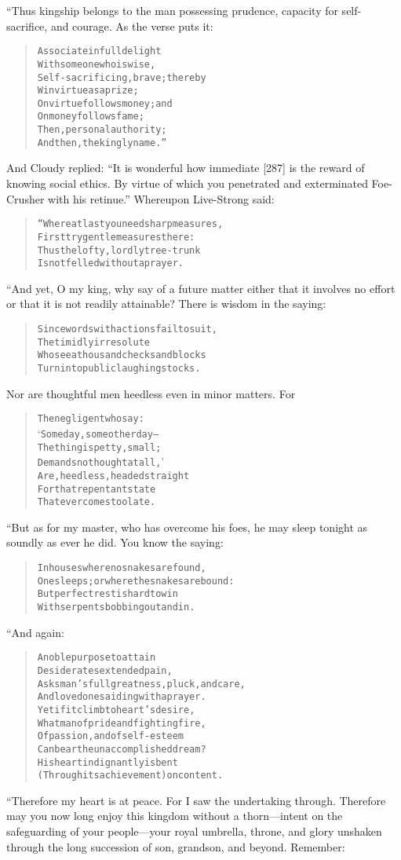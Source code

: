 \documentclass[article, twoside, 14pt]{memoir}
\renewenvironment{verbatim}{%
\begin{quote}%
\vskip -10pt%
\begin{alltt}\normalfont\large}{\end{alltt}%
\end{quote}%
\vskip -10pt
} %
\begin{document}
“Thus kingship belongs to the man possessing prudence, capacity for
self-sacrifice, and courage. As the verse puts it:

\begin{verbatim}
Associate in full delight
    With someone who is wise,
Self-sacrificing, brave; thereby
    Win virtue as a prize;
On virtue follows money; and
    On money follows fame;
Then, personal authority;
    And then, the kingly name.”
\end{verbatim}
And Cloudy replied:
``It is wonderful how immediate [287] is the reward of knowing social ethics. By virtue of which you penetrated and exterminated Foe-Crusher with his retinue.''
Whereupon Live-Strong said:

\begin{verbatim}
“Where at last you need sharp measures,
    First try gentle measures there:
Thus the lofty, lordly tree-trunk
    Is not felled without a prayer.
\end{verbatim}
“And yet, O my king, why say of a future matter either that it
involves no effort or that it is not readily attainable? There is
wisdom in the saying:

\begin{verbatim}
Since words with actions fail to suit,
The timidly irresolute
Who see a thousand checks and blocks
Turn into public laughingstocks.
\end{verbatim}
Nor are thoughtful men heedless even in minor matters. For

\begin{verbatim}
The negligent who say:
‘Some day, some other day--
The thing is petty, small;
Demands no thought at all,’
Are, heedless, headed straight
For that repentant state
That ever comes too late.
\end{verbatim}
“But as for my master, who has overcome his foes, he may sleep
tonight as soundly as ever he did. You know the saying:

\begin{verbatim}
In houses where no snakes are found,
One sleeps; or where the snakes are bound:
But perfect rest is hard to win
With serpents bobbing out and in.
\end{verbatim}
“And again:

\begin{verbatim}
A noble purpose to attain
Desiderates extended pain,
Asks man's full greatness, pluck, and care,
And loved ones aiding with a prayer.
Yet if it climb to heart's desire,
What man of pride and fighting fire,
Of passion, and of self-esteem
Can bear the unaccomplished dream?
His heart indignantly is bent
(Through its achievement) on content.
\end{verbatim}
“Therefore my heart is at peace. For I saw the undertaking through.
Therefore may you now long enjoy this kingdom without a
thorn---intent on the safeguarding of your people---your royal
umbrella, throne, and glory unshaken through the long succession of
son, grandson, and beyond. Remember:
\end{document}

